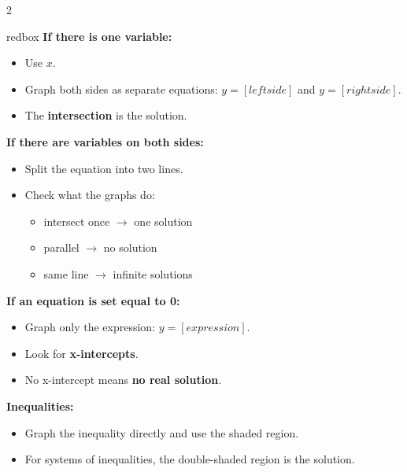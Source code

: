 \documentclass[10pt]{article}
\begin{document}
\begin{multicols}{2}
        \begin{skillbox}{redbox}
            \textbf{If there is one variable:}
            \begin{itemize}[noitemsep, topsep=0pt]
                \item Use \textbf{$x$}.
                \item Graph both sides as separate equations: $y=[left side]$ and $y=[right side]$.
                \item The \textbf{intersection} is the solution.
            \end{itemize}

            \textbf{If there are variables on both sides:}
            \begin{itemize}[noitemsep, topsep=0pt]
                \item Split the equation into two lines.
                \item Check what the graphs do:
                \begin{itemize}
                    \item intersect once $\rightarrow$ one solution
                    \item parallel $\rightarrow$ no solution
                    \item same line $\rightarrow$ infinite solutions
                \end{itemize}
            \end{itemize}

            \textbf{If an equation is set equal to 0:}
            \begin{itemize}
                \item Graph only the expression: $y=[expression]$.
                \item Look for \textbf{x-intercepts}.
                \item No x-intercept means \textbf{no real solution}.
            \end{itemize}

            \textbf{Inequalities:}
            \begin{itemize}
                \item Graph the inequality directly and use the shaded region.
                \item For systems of inequalities, the double-shaded region is the solution.
            \end{itemize}
        \end{skillbox}


\end{multicols}
\end{document}
